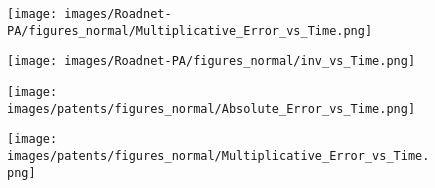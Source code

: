 \begin{figure*}[htbp]
\begin{subfigure}[b]{\textwidth}
\begin{minipage}[b]{0.3\textwidth}
		\end{minipage}%
		\begin{minipage}[b]{0.3\textwidth}
			\centering
			
			\texttt{[image: images/Roadnet-PA/figures\_normal/Multiplicative\_Error\_vs\_Time.png]} %
			
		\end{minipage}%
		\begin{minipage}[b]{0.3\textwidth}
			\centering
			
			\texttt{[image: images/Roadnet-PA/figures\_normal/inv\_vs\_Time.png]} %
		\end{minipage}
		
	\end{subfigure}
	\begin{subfigure}[b]{\textwidth}
		\centering
		\begin{minipage}[b]{0.05\textwidth}
			\centering
		\end{minipage}%
		\begin{minipage}[b]{0.3\textwidth}
			\centering
			\texttt{[image: images/patents/figures\_normal/Absolute\_Error\_vs\_Time.png]} %
			
		\end{minipage}%
		\begin{minipage}[b]{0.3\textwidth}
			\centering
			
			\texttt{[image: images/patents/figures\_normal/Multiplicative\_Error\_vs\_Time.png]} %
			
		\end{minipage}%
		\begin{minipage}[b]{0.3\textwidth}
			\centering
			

\end{minipage}
\end{subfigure}
\end{figure*}
